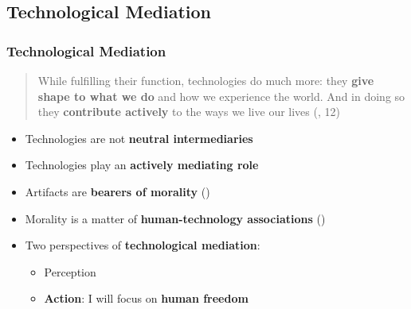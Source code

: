 \documentclass{beamer}
\begin{document}
\subsection{Technological Mediation}
\begin{frame}[fragile]
\frametitle{Technological Mediation}
\begin{quote}While fulfilling their function, technologies do much more: they \textbf{give shape to what we do} and how we experience the world. 
	And in doing so they \textbf{contribute actively} to the ways we live our lives (\cite{verbeek2011moralizing}, 12)
\end{quote}

\begin{itemize}
	\item Technologies are not \textbf{neutral intermediaries}
	\item Technologies play an \textbf{actively mediating role} 
	\medskip
	\item Artifacts are \textbf{bearers of morality} (\cite{latour1992})
	\item Morality is a matter of \textbf{human-technology associations} (\cite{verbeek2011moralizing})

\end{itemize}

\begin{itemize}
	\item Two perspectives of \textbf{technological mediation}:
	\begin{itemize}
		\item Perception
		\item \textbf{Action}: I will focus on \textbf{human freedom}
	\end{itemize}
\end{itemize}

\end{frame}
\end{document}
